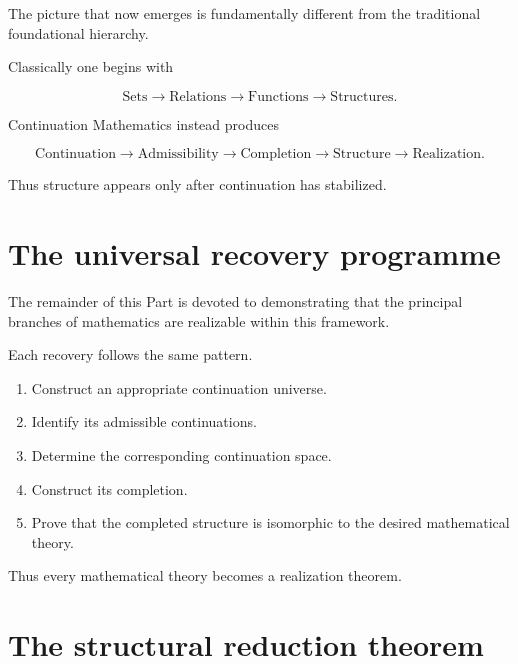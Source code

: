 \documentclass[13pt,openany]{book}
\theoremstyle{plain}
\theoremstyle{definition}
\begin{document}
The picture that now emerges is fundamentally different from the traditional
foundational hierarchy.

Classically one begins with

\[
\text{Sets}
\longrightarrow
\text{Relations}
\longrightarrow
\text{Functions}
\longrightarrow
\text{Structures}.
\]

Continuation Mathematics instead produces

\[
\text{Continuation}
\longrightarrow
\text{Admissibility}
\longrightarrow
\text{Completion}
\longrightarrow
\text{Structure}
\longrightarrow
\text{Realization}.
\]

Thus structure appears only after continuation has stabilized.


\section{The universal recovery programme}

The remainder of this Part is devoted to demonstrating that the principal
branches of mathematics are realizable within this framework.

Each recovery follows the same pattern.

\begin{enumerate}
\item Construct an appropriate continuation universe.

\item Identify its admissible continuations.

\item Determine the corresponding continuation space.

\item Construct its completion.

\item Prove that the completed structure is isomorphic to the desired
mathematical theory.
\end{enumerate}

Thus every mathematical theory becomes a realization theorem.


\section{The structural reduction theorem}
\end{document}
